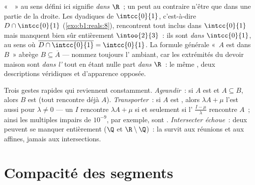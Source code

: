 \begin{example}\label{ex:b1:topology:relativedensity}
«~~» au sens défini ici signifie  \emph{dans $\R$}~; un
 peut au contraire n'être  que dans une partie de la
droite. Les dyadiques de $\intcc{0}{1}$, c'est-à-dire $D \cap
\intcc{0}{1}$ (\cref{exo:b1:reals:8}), rencontrent tout 
 inclus dans $\intcc{0}{1}$ mais manquent bien sûr
entièrement $\intoo{2}{3}$~: ils sont  \emph{dans}
$\intcc{0}{1}$, au sens où $\overline{D \cap \intcc{0}{1}} =
\intcc{0}{1}$. La formule générale «~$A$ est  dans $B$~»
abrège $B \subseteq \overline A$ --- nommez toujours l'
ambiant, car les extrémités du devoir maison sont 
\emph{dans l'} tout en étant nulle part 
\emph{dans $\R$}~: le même , deux descriptions véridiques
et d'apparence opposée.
\end{example}

\begin{example}\label{ex:b1:topology:densitytricks}
Trois gestes rapides qui reviennent constamment. \emph{Agrandir}~:
si $A$ est  et $A \subseteq B$, alors $B$ est  (tout
 rencontre déjà $A$). \emph{Transporter}~: si $A$ est
, alors $\lambda A + \mu$ l'est aussi pour $\lambda \neq 0$
--- un  $I$ rencontre $\lambda A + \mu$ si et seulement
si l' $\frac{I - \mu}{\lambda}$ rencontre $A$~; ainsi
les multiples impairs de $10^{-9}$, par exemple, sont .
\emph{Intersecter échoue}~: deux   peuvent se
manquer entièrement ($\Q$ et $\R \setminus \Q$)~: la 
survit aux réunions et aux  affines, jamais aux
intersections.
\end{example}

\section{Compacité des segments}

